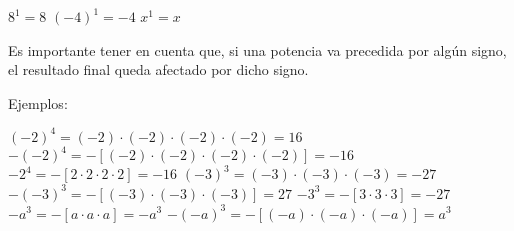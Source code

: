 \begin{ejemplos}[1][\textbullet]
  \task $8^1 = 8$
  \task $(-4)^1 = -4$
  \task $x^1 = x$
\end{ejemplos}




Es importante tener en cuenta que, si una potencia va precedida por
algún signo, el resultado final queda afectado por dicho signo.  

Ejemplos:

\begin{ejemplos}[1][\textbullet]
  \task $(-2)^4 = (-2)\cdot(-2)\cdot(-2)\cdot(-2) = 16$
  \task $-(-2)^4 = -[(-2)\cdot(-2)\cdot(-2)\cdot(-2)] = -16$
  \task $-2^4 = -[2 \cdot 2 \cdot 2 \cdot 2] = -16$
  \task $(-3)^3 = (-3)\cdot(-3)\cdot(-3) = -27$
  \task $-(-3)^3 = -[(-3)\cdot(-3)\cdot(-3)] = 27$
  \task $-3^3 = -[3 \cdot 3 \cdot 3] = -27$
  \task $-a^3 = -[a \cdot a \cdot a] = -a^3$
  \task $-(-a)^3 = -[(-a)\cdot(-a)\cdot(-a)] = a^3$
\end{ejemplos}











